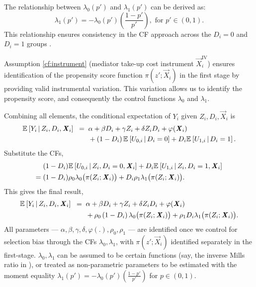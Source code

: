 The relationship between $\lambda_0(p')$ and $\lambda_1(p')$ can be derived as:
\[ \lambda_1 \left(p'\right) = -\lambda_0 \left(p'\right) \left( \frac{1-p'}{p'} \right), \text{ for } p' \in (0,1). \]
This relationship ensures consistency in the CF approach across the $D_i=0$ and $D_i= 1$ groups \citep{kline2019heckits}.

Assumption \ref{cf:instrument} (mediator take-up cost instrument $\vec X_i^{\text{IV}}$) ensures identification of the propensity score function $\pi(z'; \vec X_i)$ in the first stage by providing valid instrumental variation.
This variation allows us to identify the propensity score, and consequently the control functions $\lambda_0$ and $\lambda_1$.

Combining all elements, the conditional expectation of $Y_i$ given $Z_i, D_i, \vec X_i$ is
\begin{align*}
    \mathbb{E}_{} \left[ Y_i \, \middle\vert \, Z_i, D_i, \boldsymbol{\mathit{X}}_i \right] \;\; =& \;\;
        \alpha
        + \beta D_i
        + \gamma Z_i
        + \delta Z_i D_i
        + \varphi(\boldsymbol{\mathit{X}}_i) \\
        & \;\; + \left( 1 - D_i \right) \mathbb{E}_{} \left[ U_{0,i} \, \middle\vert \, D_i = 0 \right]
            + D_i \mathbb{E}_{} \left[ U_{1,i} \, \middle\vert \, D_i = 1 \right].
\end{align*}
Substitute the CFs,
\begin{align*}
    &\;(1-D_i) \mathbb{E}_{} \left[  U_{0,i}  \, \middle\vert \, Z_i, D_i=0, \boldsymbol{\mathit{X}}_i \right]
        + D_i \mathbb{E}_{} \left[  U_{1,i} \, \middle\vert \, Z_i, D_i=1, \boldsymbol{\mathit{X}}_i \right] \\
    =&\; (1-D_i)\rho_0 \lambda_0 \big(\pi(Z_i; \boldsymbol{\mathit{X}}_i) \big)
    + D_i \rho_1 \lambda_1 \big(\pi(Z_i; \boldsymbol{\mathit{X}}_i) \big).
\end{align*}
This gives the final result,
\begin{align*}
    \mathbb{E}_{} \left[ Y_i \, \middle\vert \, Z_i, D_i, \boldsymbol{\mathit{X}}_i \right] \;\; =& \;\;
        \alpha
        + \beta D_i
        + \gamma Z_i
        + \delta Z_i D_i
        + \varphi(\boldsymbol{\mathit{X}}_i) \\
        & \;\; +  \rho_0 \left( 1 - D_i \right) \lambda_0 \big( \pi(Z_i ; \boldsymbol{\mathit{X}}_i) \big)
            + \rho_1 D_i \lambda_1 \big( \pi(Z_i ; \boldsymbol{\mathit{X}}_i) \big).
\end{align*}
All parameters --- $\alpha, \beta, \gamma, \delta, \varphi(.), \rho_0, \rho_1$ --- are identified once we control for selection bias through the CFs $\lambda_0, \lambda_1$, with $\pi(z';\vec X_i)$ identified separately in the first-stage.
$\lambda_0, \lambda_1$ can be assumed to be certain functions (say, the inverse Mills ratio in \citealt{heckman1979sample}), or treated as non-parametric parameters to be estimated with the moment equality $\lambda_1 \left(p'\right) = -\lambda_0 \left(p'\right) \left( \frac{1-p'}{p'} \right)$ for $p \in (0,1)$.

